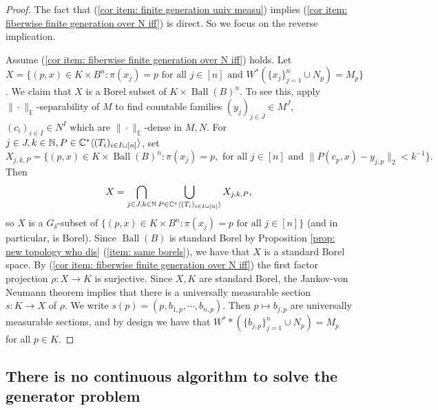 \documentclass[10pt]{amsart}
\theoremstyle{definition}
\numberwithin{equation}{section}
\newcommand{\bC}{{\mathbb C}}
\newcommand{\bE}{{\mathbb E}}
\newcommand{\bN}{{\mathbb N}}
\DeclareMathOperator{\Ball}{Ball}
\DeclarePairedDelimiter{\ip}{\langle}{\rangle}
\begin{document}
\begin{proof}
The fact that (\ref{cor item: finite generation univ measu}) implies (\ref{cor item: fiberwise finite generation over N iff}) is direct. So we focus on the reverse implication.

Assume (\ref{cor item: fiberwise finite generation over N iff}) holds. Let $X=\{(p,x)\in K\times B^{n}:\pi(x_{j})=p \text{ for all $j\in [n]$ and } W^{*}(\{x_{j}\}_{j=1}^{n}\cup N_{p})=M_{p}\}$. We claim that $X$ is a Borel subset of $K\times \Ball(B)^{n}$. To see this, apply $\|\cdot\|_{\bE}$-separability of $M$ to find  countable families $(y_{j})_{j\in J}\in M^{J}$, $(c_{i})_{i\in I}\in N^{I}$ which are $\|\cdot\|_{\bE}$-dense in $M,N$. 
For $j\in J,k\in \bN,P\in \bC^{*}\ip{(T_{i})_{i\in I\sqcup [n]}}$, set 
\[X_{j,k,P}=\{(p,x)\in K\times \Ball(B)^{n}:\pi(x_{j})=p, \text{ for all $j\in [n]$ and } \|P(c_{p},x)-y_{j,p}\|_{2}<k^{-1}\}.\]
Then
\[X=\bigcap_{j\in J,k\in \bN}\bigcup_{P\in \bC^{*}\ip{(T_{i})_{i\in I\sqcup [n]}}}X_{j,k,P},\]
so $X$ is a $G_{\delta}$-subset of $\{(p,x)\in K\times B^{n}:\pi(x_{j})=p \text{ for all $j\in [n]$}\}$ (and in particular, is Borel). 
Since $\Ball(B)$ is standard Borel by Proposition \ref{prop: new topology who dis} (\ref{item: same borels}), we have that $X$ is a standard Borel space. By (\ref{cor item: fiberwise finite generation over N iff}) the first factor projection $\rho\colon X\to K$ is surjective. Since $X,K$ are standard Borel, the Jankov-von Neumann theorem \cite[Theorems 18.1, 21.10]{KechrisClassic} implies that there is a universally measurable section $s\colon K\to X$ of $\rho$. We write $s(p)=(p,b_{1,p},\cdots,b_{n,p})$. Then $p\mapsto b_{j,p}$ are universally measurable sections, and by design we have that 
$W^*{*}(\{b_{j,p}\}_{j=1}^{n}\cup N_{p})=M_{p}$ for all $p\in K$. 


    
\end{proof}


\subsection{There is no continuous algorithm to solve the generator problem}
\end{document}
